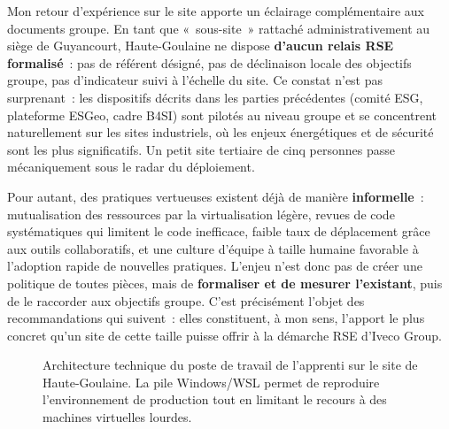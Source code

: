 Mon retour d'expérience sur le site apporte un éclairage complémentaire aux documents groupe. En tant que «~sous-site~» rattaché administrativement au siège de Guyancourt, Haute-Goulaine ne dispose \textbf{d'aucun relais RSE formalisé}~: pas de référent désigné, pas de déclinaison locale des objectifs groupe, pas d'indicateur suivi à l'échelle du site. Ce constat n'est pas surprenant~: les dispositifs décrits dans les parties précédentes (comité ESG, plateforme ESGeo, cadre B4SI) sont pilotés au niveau groupe et se concentrent naturellement sur les sites industriels, où les enjeux énergétiques et de sécurité sont les plus significatifs. Un petit site tertiaire de cinq personnes passe mécaniquement sous le radar du déploiement.

Pour autant, des pratiques vertueuses existent déjà de manière \textbf{informelle}~: mutualisation des ressources par la virtualisation légère, revues de code systématiques qui limitent le code inefficace, faible taux de déplacement grâce aux outils collaboratifs, et une culture d'équipe à taille humaine favorable à l'adoption rapide de nouvelles pratiques. L'enjeu n'est donc pas de créer une politique de toutes pièces, mais de \textbf{formaliser et de mesurer l'existant}, puis de le raccorder aux objectifs groupe. C'est précisément l'objet des recommandations qui suivent~: elles constituent, à mon sens, l'apport le plus concret qu'un site de cette taille puisse offrir à la démarche RSE d'Iveco Group.

\begin{figure}[htbp]
\centering
{}
\caption{Architecture technique du poste de travail de l'apprenti sur le site de Haute-Goulaine. La pile Windows/WSL permet de reproduire l'environnement de production tout en limitant le recours à des machines virtuelles lourdes.}
\label{fig:archi}
\end{figure}

